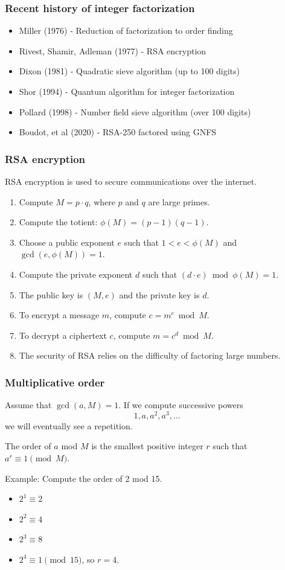 \documentclass{beamer}
\begin{document}
\begin{frame}
\frametitle{Recent history of integer factorization}
\begin{itemize}

\item Miller (1976) - Reduction of factorization to order finding
\item Rivest, Shamir, Adleman (1977) - RSA encryption
\item Dixon (1981) - Quadratic sieve algorithm (up to 100 digits)
\item Shor (1994) - Quantum algorithm for integer factorization
\item Pollard (1998) - Number field sieve algorithm (over 100 digits)
\item Boudot, et al (2020) - RSA-250 factored using GNFS
\end{itemize}
\end{frame}

\begin{frame}
\frametitle{RSA encryption}

RSA encryption is used to secure communications over the internet.

\begin{enumerate}
    \item Compute $M = p \cdot q$, where $p$ and $q$ are large primes.
    \item Compute the totient: $\phi(M) = (p-1)(q-1)$.
    \item Choose a public exponent $e$ such that $1 < e < \phi(M)$ and $\gcd(e, \phi(M)) = 1$.
    \item Compute the private exponent $d$ such that $(d \cdot e) \bmod{\phi(M)} = 1$.
    \item The public key is $(M, e)$ and the private key is $d$.
    \item To encrypt a message $m$, compute $c = m^e \bmod{M}$.
    \item To decrypt a ciphertext $c$, compute $m = c^d \bmod{M}$.
    \item The security of RSA relies on the difficulty of factoring large numbers. 
\end{enumerate}
\end{frame}

\begin{frame}
\frametitle{Multiplicative order}
Assume that $\gcd(a, M) = 1$. 
If we compute successive powers 
$$1, a, a^2, a^3, \ldots$$
we will eventually see a repetition.

The order of $a$ mod $M$ is the smallest positive 
integer $r$ such that $a^r \equiv 1 \pmod{M}$.

Example: Compute the order of 2 mod 15.
\begin{itemize}
    \item $2^1 \equiv 2$
    \item $2^2 \equiv 4$
    \item $2^3 \equiv 8$
    \item $2^4 \equiv 1 \pmod{15}$, so $r = 4$.
\end{itemize}

\end{frame}
\end{document}
